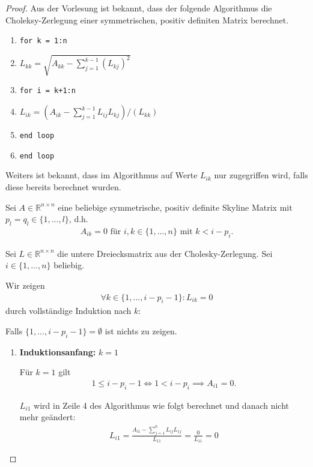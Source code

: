 \documentclass[titlepage]{article}
\begin{document}
\begin{proof}
	Aus der Vorlesung ist bekannt, dass der folgende Algorithmus die Choleksy-Zerlegung einer symmetrischen, positiv definiten Matrix berechnet.
	\begin{enumerate}[label={(\arabic*)}]
		\item \texttt{for k = 1:n}
		\item \hspace{5mm} $L_{kk} = \sqrt{A_{kk} - \sum_{j=1}^{k-1}(L_{kj})^2}$
		\item \hspace{5mm} \texttt{for i = k+1:n}
		\item \hspace{10mm} $L_{ik} = (A_{ik} - \sum_{j=1}^{k-1}L_{ij}L_{kj})/(L_{kk})$
		\item \hspace{5mm} \texttt{end loop}
		\item \texttt{end loop}
	\end{enumerate}

	Weiters ist bekannt, dass im Algorithmus auf Werte $L_{ik}$ nur zugegriffen wird, falls diese bereits berechnet wurden.
	
	Sei $A \in \mathbb{R}^{n\times n}$ eine beliebige symmetrische, positiv definite Skyline Matrix mit $p_l = q_l \in \{1, ..., l\}$, d.h.
	\begin{align*}
		A_{ik} = 0 \text{ für } i,k \in \{1, ..., n\} \text{ mit } k < i - p_i.
	\end{align*}
	
	Sei $L \in \mathbb{R}^{n\times n}$ die untere Dreiecksmatrix aus der Cholesky-Zerlegung. Sei $i \in \{1, ..., n\}$ beliebig.
	
	Wir zeigen
	\begin{align}
		\forall k \in \{1, ..., i - p_i - 1\}: L_{ik} = 0
	\end{align}
	durch vollständige Induktion nach $k$:
	
	Falls $\{1, ..., i - p_i - 1\} = \emptyset$ ist nichts zu zeigen.
	
	\begin{enumerate}
		\item \textbf{Induktionsanfang:} $k=1$
		
		Für $k=1$ gilt
		\begin{align*}
			1 \leq i - p_i - 1 \iff 1 < i - p_i \implies A_{i1} = 0.
		\end{align*}
		
		$L_{i1}$ wird in Zeile 4 des Algorithmus wie folgt berechnet und danach nicht mehr geändert:
		\begin{align*}
			L_{i1} = \frac{A_{i1} - \sum_{j=1}^{0}L_{ij}L_{1j}}{L_{11}} = \frac{0}{L_{11}} = 0
		\end{align*}
	

\end{enumerate}
\end{proof}
\end{document}
